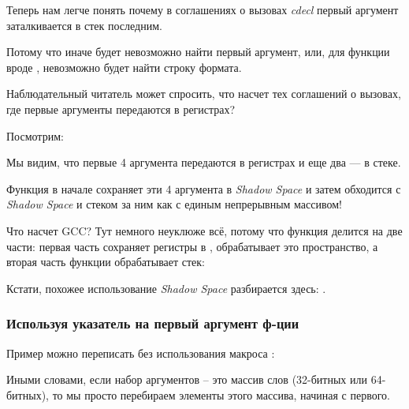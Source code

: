 Теперь нам легче понять почему в соглашениях о вызовах \emph{cdecl} первый аргумент 
заталкивается в стек последним.

Потому что иначе будет невозможно найти первый аргумент, или, для функции вроде \printf, невозможно
будет найти строку формата.

\label{variadic_arith_registers}

Наблюдательный читатель может спросить, что насчет тех соглашений о вызовах, где первые аргументы передаются
в регистрах?

Посмотрим:



Мы видим, что первые 4 аргумента передаются в регистрах и еще два --- в стеке.

Функция  в начале сохраняет эти 4 аргумента в \emph{Shadow Space} и затем обходится
с \emph{Shadow Space} и стеком за ним как с единым непрерывным массивом!

Что насчет GCC? Тут немного неуклюже всё, потому что функция делится на две части: первая часть
сохраняет регистры в , обрабатывает это пространство, а вторая часть функции обрабатывает стек:



Кстати, похожее использование \emph{Shadow Space} разбирается здесь: .

\subsubsection{Используя указатель на первый аргумент ф-ции}

Пример можно переписать без использования макроса :



Иными словами, если набор аргументов -- это массив слов (32-битных или 64-битных), то мы просто перебираем элементы
этого массива, начиная с первого.

